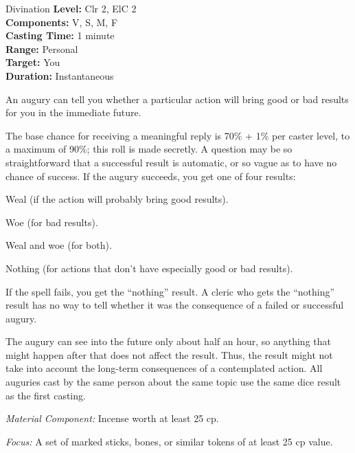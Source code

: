{Divination}
{
	\textbf{Level:}
	Clr 2, ElC 2\\
	\textbf{Components:}
	V, S, M, F\\
	\textbf{Casting Time:}
	1 minute\\
	\textbf{Range:}
	Personal\\
	\textbf{Target:}
	You\\
	\textbf{Duration:}
	Instantaneous\\
}
{
	An augury can tell you whether a particular action will bring good or bad results for you in the immediate future.

	The base chance for receiving a meaningful reply is 70\% + 1\% per caster level, to a maximum of 90\%; this roll is made secretly. A question may be so straightforward that a successful result is automatic, or so vague as to have no chance of success. If the augury succeeds, you get one of four results:

\begin{itemize*}
\item Weal (if the action will probably bring good results).
\item Woe (for bad results).
\item Weal and woe (for both).
\item Nothing (for actions that don't have especially good or bad results).
\end{itemize*}

	If the spell fails, you get the ``nothing'' result. A cleric who gets the ``nothing'' result has no way to tell whether it was the consequence of a failed or successful augury.

	The augury can see into the future only about half an hour, so anything that might happen after that does not affect the result. Thus, the result might not take into account the long-term consequences of a contemplated action. All auguries cast by the same person about the same topic use the same dice result as the first casting.

	\textit{Material Component:}
	Incense worth at least 25 cp.

	\textit{Focus:}
	A set of marked sticks, bones, or similar tokens of at least 25 cp value.

}
